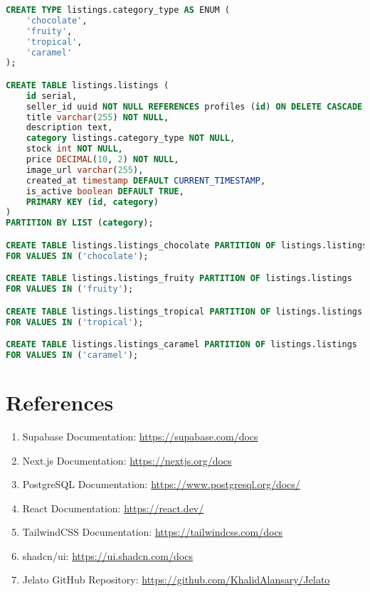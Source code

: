 \documentclass[12pt,a4paper]{report}
\begin{document}
\begin{lstlisting}[language=SQL, basicstyle=\ttfamily\small, frame=single, caption={SQL code for partitioned listings table}]
CREATE TYPE listings.category_type AS ENUM (
    'chocolate',
    'fruity',
    'tropical',
    'caramel'
);

CREATE TABLE listings.listings (
    id serial,
    seller_id uuid NOT NULL REFERENCES profiles (id) ON DELETE CASCADE,
    title varchar(255) NOT NULL,
    description text,
    category listings.category_type NOT NULL,
    stock int NOT NULL,
    price DECIMAL(10, 2) NOT NULL,
    image_url varchar(255),
    created_at timestamp DEFAULT CURRENT_TIMESTAMP,
    is_active boolean DEFAULT TRUE,
    PRIMARY KEY (id, category)
)
PARTITION BY LIST (category);

CREATE TABLE listings.listings_chocolate PARTITION OF listings.listings
FOR VALUES IN ('chocolate');

CREATE TABLE listings.listings_fruity PARTITION OF listings.listings
FOR VALUES IN ('fruity');

CREATE TABLE listings.listings_tropical PARTITION OF listings.listings
FOR VALUES IN ('tropical');

CREATE TABLE listings.listings_caramel PARTITION OF listings.listings
FOR VALUES IN ('caramel');
\end{lstlisting}

\chapter{References}
\begin{enumerate}
    \item Supabase Documentation: \url{https://supabase.com/docs}
    \item Next.js Documentation: \url{https://nextjs.org/docs}
    \item PostgreSQL Documentation: \url{https://www.postgresql.org/docs/}
    \item React Documentation: \url{https://react.dev/}
    \item TailwindCSS Documentation: \url{https://tailwindcss.com/docs}
    \item shadcn/ui: \url{https://ui.shadcn.com/docs}
    \item Jelato GitHub Repository: \url{https://github.com/KhalidAlansary/Jelato}
\end{enumerate}
\end{document}
